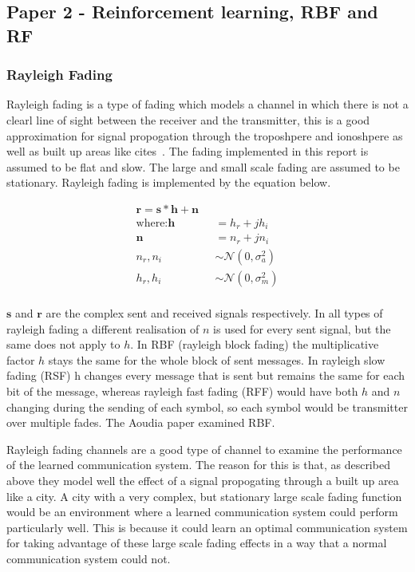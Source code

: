 \documentclass[12pt,onecolumn,letterpaper]{article}
\begin{document}
\subsection{Paper 2 - Reinforcement learning, RBF and RF}

\subsubsection{Rayleigh Fading}

Rayleigh fading is a type of fading which models a channel in which there is not a clearl line of sight between the receiver and the transmitter, this is a good approximation for signal propogation through the troposhpere and ionoshpere as well as built up areas like cites~\cite{RayleighProakis}. The fading implemented in this report is assumed to be flat and slow. The large and small scale fading are assumed to be stationary. Rayleigh fading is implemented by the equation below.

\begin{align}
   \mathbf{r} = \mathbf{s}*\mathbf{h} + \mathbf{n} \mbox{ }&\nonumber\\
   \mbox{where:}\mathbf{h} &= h_r + jh_i \nonumber\\
   \mathbf{n} &= n_r + jn_i \nonumber\\
   n_r,n_i &\sim \mathcal{N}(0,\sigma_a^2) \nonumber\\
   h_r,h_i &\sim \mathcal{N}(0,\sigma_m^2) \nonumber\\
   \label{eq:RaylieghDef}
\end{align}

$\mathbf{s}$ and $\mathbf{r}$ are the complex sent and received signals respectively. In all types of rayleigh fading a different realisation of $n$ is used for every sent signal, but the same does not apply to $h$. In RBF (rayleigh block fading) the multiplicative factor $h$ stays the same for the whole block of sent messages. In rayleigh slow fading (RSF) h changes every message that is sent but remains the same for each bit of the message, whereas rayleigh fast fading (RFF) would have both $h$ and $n$ changing during the sending of each symbol, so each symbol would be transmitter over multiple fades. The Aoudia paper examined RBF.

Rayleigh fading channels are a good type of channel to examine the performance of the learned communication system. The reason for this is that, as described above they model well the effect of a signal propogating through a built up area like a city. A city with a very complex, but stationary large scale fading function would be an environment where a learned communication system could perform particularly well. This is because it could learn an optimal communication system for taking advantage of these large scale fading effects in a way that a normal communication system could not.
\end{document}
